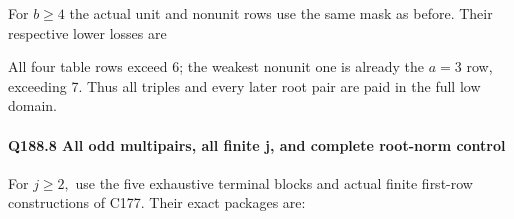 

For \(b\ge 4\) the actual unit and nonunit rows use the same mask as before. Their respective lower losses are



All four table rows exceed 6; the weakest nonunit one is already the \(a=3\) row, exceeding 7. Thus all triples and every later root pair are paid in the full low domain.

\paragraph{Q188.8 All odd multipairs, all finite j, and complete root-norm control}

For \(j\ge 2,\allowbreak \allowbreak  \) use the five exhaustive terminal blocks and actual finite first-row constructions of C177. Their exact packages are:


